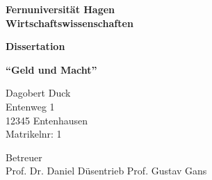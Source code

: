 \begin{titlepage}
\begin{center}
{\Huge\textbf{Fernuniversität Hagen \\ Wirtschaftswissenschaften}}
\end{center}

\vspace*{3cm}

\begin{center}
{\huge\bfseries Dissertation }
\end{center}
\vspace*{-1cm}

\begin{center}
{\huge\bfseries \enquote{Geld und Macht}}
\end{center}

\vspace*{5cm}

Dagobert Duck \\ 
Entenweg 1 \\
12345 Entenhausen \\
Matrikelnr: 1

\vfill
Betreuer \\
Prof. Dr. Daniel Düsentrieb \hfill  Prof. Gustav Gans

\end{titlepage}